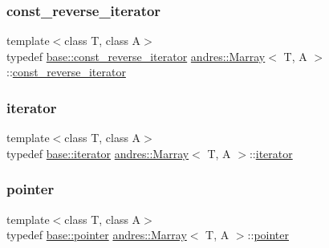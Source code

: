 \mbox{\label{classandres_1_1Marray_a03aa08b455a9fcb7c3ba9072799cad92}} 
\subsubsection{\texorpdfstring{const\+\_\+reverse\+\_\+iterator}{const\_reverse\_iterator}}
{\footnotesize\ttfamily template$<$class T, class A$>$ \\
typedef \hyperlink{classandres_1_1View_a61656971b73a48c8bf009e3200aad900}{base\+::const\+\_\+reverse\+\_\+iterator} \hyperlink{classandres_1_1Marray}{andres\+::\+Marray}$<$ T, A $>$\+::\hyperlink{classandres_1_1Marray_a03aa08b455a9fcb7c3ba9072799cad92}{const\+\_\+reverse\+\_\+iterator}}

\mbox{\label{classandres_1_1Marray_afa294c08fe2bf282f9c3b65ac8da1622}} 
\subsubsection{\texorpdfstring{iterator}{iterator}}
{\footnotesize\ttfamily template$<$class T, class A$>$ \\
typedef \hyperlink{classandres_1_1View_aef54ee0a58e755b897398493d05a44df}{base\+::iterator} \hyperlink{classandres_1_1Marray}{andres\+::\+Marray}$<$ T, A $>$\+::\hyperlink{classandres_1_1Marray_afa294c08fe2bf282f9c3b65ac8da1622}{iterator}}

\mbox{\label{classandres_1_1Marray_a42f16cbe0ebc93347dd9eed78484e951}} 
\subsubsection{\texorpdfstring{pointer}{pointer}}
{\footnotesize\ttfamily template$<$class T, class A$>$ \\
typedef \hyperlink{classandres_1_1View_a9a201594c82be89fccd0fe644ea2f09c}{base\+::pointer} \hyperlink{classandres_1_1Marray}{andres\+::\+Marray}$<$ T, A $>$\+::\hyperlink{classandres_1_1Marray_a42f16cbe0ebc93347dd9eed78484e951}{pointer}}

